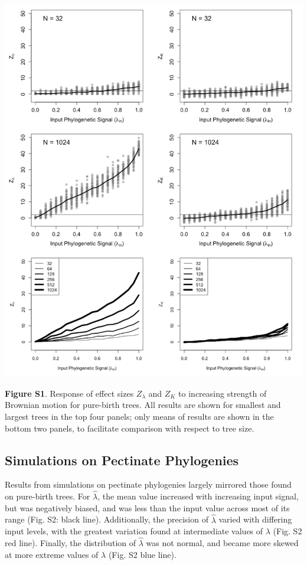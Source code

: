 \documentclass[
]{article}
\begin{document}
\includegraphics[width=0.95\linewidth]{fig.S1}

\textbf{Figure S1}. Response of effect sizes \(Z_{\lambda}\) and \(Z_K\)
to increasing strength of Brownian motion for pure-birth trees. All
results are shown for smallest and largest trees in the top four panels;
only means of results are shown in the bottom two panels, to facilitate
comparison with respect to tree size.

\newpage

\hypertarget{simulations-on-pectinate-phylogenies}{%
\subsection{Simulations on Pectinate
Phylogenies}\label{simulations-on-pectinate-phylogenies}}

Results from simulations on pectinate phylogenies largely mirrored those
found on pure-birth trees. For \(\hat{\lambda}\), the mean value
increased with increasing input signal, but was negatively biased, and
was less than the input value across most of its range (Fig. S2: black
line). Additionally, the precision of \(\hat{\lambda}\) varied with
differing input levels, with the greatest variation found at
intermediate values of \(\lambda\) (Fig. S2 red line). Finally, the
distribution of \(\hat{\lambda}\) was not normal, and became more skewed
at more extreme values of \(\lambda\) (Fig. S2 blue line). \hfill\break
\end{document}
